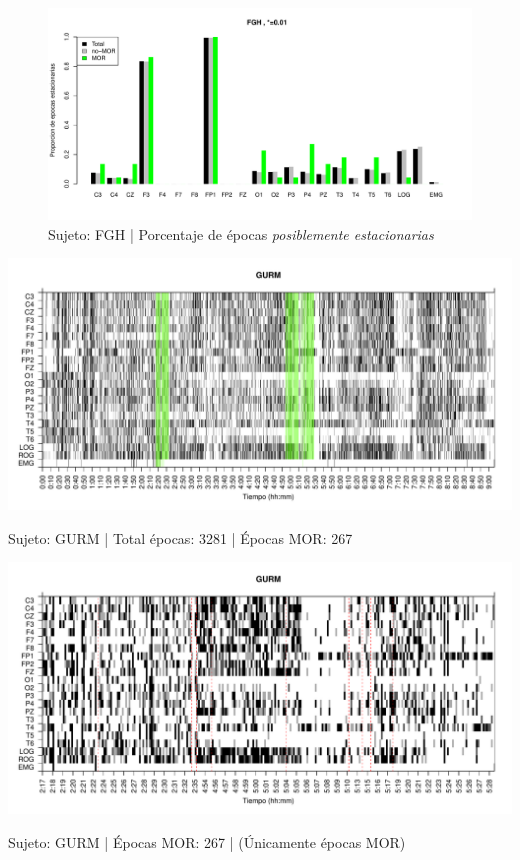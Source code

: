 \begin{figure}
\centering
\includegraphics[width=\linewidth]
{./material_bonito170220/porcentaje_bis/FGHSUE_22_405_1_bar_porcentaje.pdf} 
\caption{Sujeto: FGH | Porcentaje de \'epocas \textit{posiblemente estacionarias}}
\end{figure}


\begin{SidewaysFigure}
\centering
\includegraphics[width=\linewidth]
{./material_bonito170220/GH24031950SUENO_267_mor267_tot3281_est_total.pdf} 
\caption{Sujeto: GURM | Total \'epocas: 3281 | \'Epocas MOR: 267}
\end{SidewaysFigure}
\begin{SidewaysFigure}
\centering
\includegraphics[width=\linewidth]
{./material_bonito170220/GH24031950SUENO_267_mor267_tot267_est_mor.pdf} 
\caption{Sujeto: GURM | \'Epocas MOR: 267 | (\'Unicamente \'epocas MOR)}
\end{SidewaysFigure}


